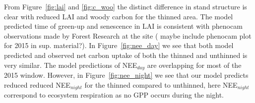 \documentclass[12pt]{article}
\begin{document}
From Figure~\ref{fig:lai} and \ref{fig:c_woo} the distinct difference in stand structure is clear with reduced LAI and woody carbon for the thinned area. The model predicted time of green-up and senescence in LAI is consistent with phenocam observations made by Forest Research at the site ({\color{red} maybe include phenocam plot for 2015 in sup. material?}). In Figure~\ref{fig:nee_day} we see that both model predicted and observed net carbon uptake of both the thinned and unthinned is very similar. The model predictions of NEE\(_{day}\) are overlapping for most of the 2015 window. However, in Figure~\ref{fig:nee_night} we see that our model predicts reduced reduced NEE\(_{night}\) for the thinned compared to unthinned, here NEE\(_{night}\) correspond to ecosystem respiration as no GPP occurs during the night.    
\end{document}
